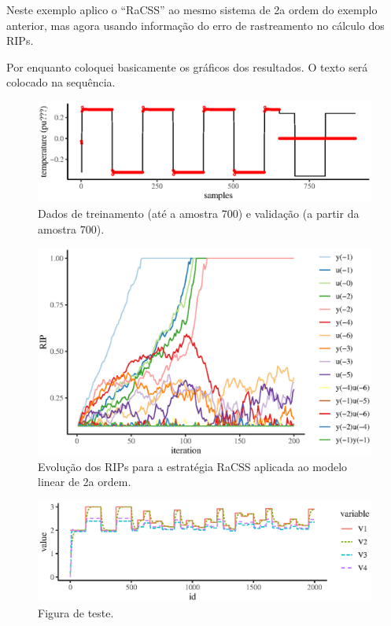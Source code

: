 \begin{exmp}

Neste exemplo aplico o ``RaCSS'' ao mesmo sistema de 2a ordem do exemplo anterior, mas agora usando informação do erro de rastreamento no cálculo dos RIPs.

Por enquanto coloquei basicamente os gráficos dos resultados. O texto será colocado na sequência.

\begin{figure}[H]
  \centering
  \includegraphics{./Figs/s.motorcc.VRFT.racss_train_val_data.eps}
  \caption{Dados de treinamento (até a amostra 700) e validação (a partir da amostra 700).}\label{fig:RIPs2}
\end{figure}

\begin{figure}[H]
  \centering
  \includegraphics{./Figs/s.motorcc.VRFT.racss_RIPs.eps}
  \caption{Evolução dos RIPs para a estratégia RaCSS aplicada ao modelo linear de 2a ordem.}
  \label{fig:RIPs2}
\end{figure}

\begin{figure}[H]
  \centering
  \includegraphics{Figs/s.heater.var.dissip.VRFT_teste.eps}
  \caption{Figura de teste.}
  \label{fig:teste}
\end{figure}


\end{exmp}
